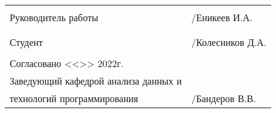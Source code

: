 \documentclass[a4paper,12pt]{extarticle}
\begin{document}
    \begin{xltabular}{\textwidth} {
            >{\hsize} X
            >{\hsize} X }
         \\
        Руководитель работы & \underline{\hspace{3cm}}/Еникеев И.А. \\
        & \\
         \\
        Студент & \underline{\hspace{3cm}}/Колесников Д.А. \\
        & \\
        Согласовано <<\underline{\hspace{1cm}}>>\underline{\hspace{3cm}} 2022г. & \\
        Заведующий кафедрой анализа данных и & \\
        технологий программирования & \underline{\hspace{3cm}}/Бандеров В.В. \\
    \end{xltabular}
\end{document}
